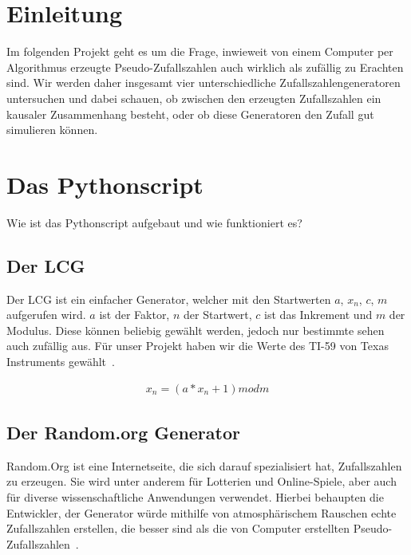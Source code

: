 \documentclass[12pt]{article}
\title{\testbf{Zufallszahlen Spektraltest}}
\author{Christian Locatelli, Alexander Wallrodt}
\date{\today}
\begin{document}
    \maketitle
    \clearpage

    \tableofcontents
    \listoftables
    \listoffigures

    \clearpage


    \section{Einleitung}\label{sec:Einleitung}
    Im folgenden Projekt geht es um die Frage, inwieweit von einem Computer per Algorithmus erzeugte Pseudo-Zufallszahlen
    auch wirklich als zufällig zu Erachten sind.
    Wir werden daher insgesamt vier unterschiedliche Zufallszahlengeneratoren untersuchen und dabei schauen,
    ob zwischen den erzeugten Zufallszahlen ein kausaler Zusammenhang besteht,
    oder ob diese Generatoren den Zufall gut simulieren können.



    \section{Das Pythonscript}\label{sec:das-pythonscript}
    Wie ist das Pythonscript aufgebaut und wie funktioniert es?

    \subsection{Der LCG}\label{subsec:der-lcg}
    Der LCG ist ein einfacher Generator, welcher mit den Startwerten $a$, $x_n$, $c$, $m$ aufgerufen wird.
    $a$ ist der Faktor, $n$ der Startwert, $c$ ist das Inkrement und $m$ der Modulus.
    Diese können beliebig gewählt werden, jedoch nur bestimmte sehen auch zufällig aus.
    Für unser Projekt haben wir die Werte des TI-59 von Texas Instruments gewählt~\cite{lcg}.

    \begin{align*}
    x_n = (a * x_n + 1) mod m
    \end{align*}

    \subsection{Der Random.org Generator}\label{subsec:der-random.org-generator}
    Random.Org ist eine Internetseite, die sich darauf spezialisiert hat, Zufallszahlen zu erzeugen.
    Sie wird unter anderem für Lotterien und Online-Spiele, aber auch für diverse wissenschaftliche
    Anwendungen verwendet.
    Hierbei behaupten die Entwickler, der Generator würde mithilfe von atmosphärischem
    Rauschen echte Zufallszahlen erstellen, die besser sind als die von Computer erstellten Pseudo-Zufallszahlen~\cite{random-org}.
\end{document}
